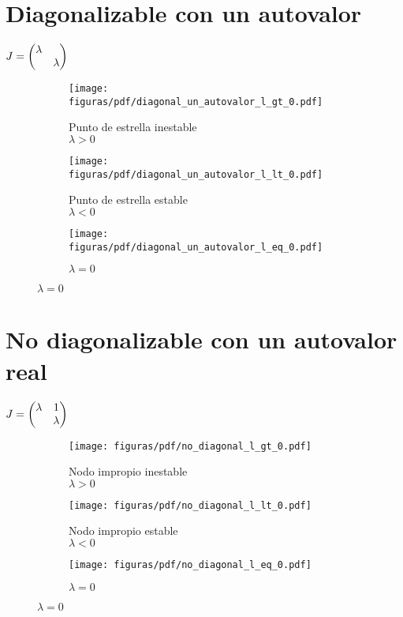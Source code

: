 \documentclass[../ecuaciones_diferenciales.tex]{subfiles}
\begin{document}
\section{Diagonalizable con un autovalor}
\(J = \begin{pmatrix}\lambda & \\ & \lambda\end{pmatrix}\)
\begin{figure}[ht]
  \centering
  \begin{subfigure}{0.33\textwidth}
    \centering
    \texttt{[image: figuras/pdf/diagonal\_un\_autovalor\_l\_gt\_0.pdf]}
    \caption*{Punto de estrella inestable \\ \(\lambda > 0\)}
  \end{subfigure}%
  \begin{subfigure}{0.33\textwidth}
    \centering
    \texttt{[image: figuras/pdf/diagonal\_un\_autovalor\_l\_lt\_0.pdf]}
    \caption*{Punto de estrella estable \\ \(\lambda < 0\)}
  \end{subfigure}%
  \begin{subfigure}{0.33\textwidth}
    \centering
    \texttt{[image: figuras/pdf/diagonal\_un\_autovalor\_l\_eq\_0.pdf]}
    \caption*{\(\lambda = 0\)}
  \end{subfigure}
\end{figure}

\section{No diagonalizable con un autovalor real}
\(J = \begin{pmatrix}\lambda & 1 \\ & \lambda\end{pmatrix}\)
\begin{figure}[ht]
  \centering
  \begin{subfigure}{0.33\textwidth}
    \centering
    \texttt{[image: figuras/pdf/no\_diagonal\_l\_gt\_0.pdf]}
    \caption*{Nodo impropio inestable \\ \(\lambda > 0\)}
  \end{subfigure}%
  \begin{subfigure}{0.33\textwidth}
    \centering
    \texttt{[image: figuras/pdf/no\_diagonal\_l\_lt\_0.pdf]}
    \caption*{Nodo impropio estable \\ \(\lambda < 0\)}
  \end{subfigure}%
  \begin{subfigure}{0.33\textwidth}
    \centering
    \texttt{[image: figuras/pdf/no\_diagonal\_l\_eq\_0.pdf]}
    \caption*{\(\lambda = 0\)}
  \end{subfigure}
\end{figure}
\end{document}
